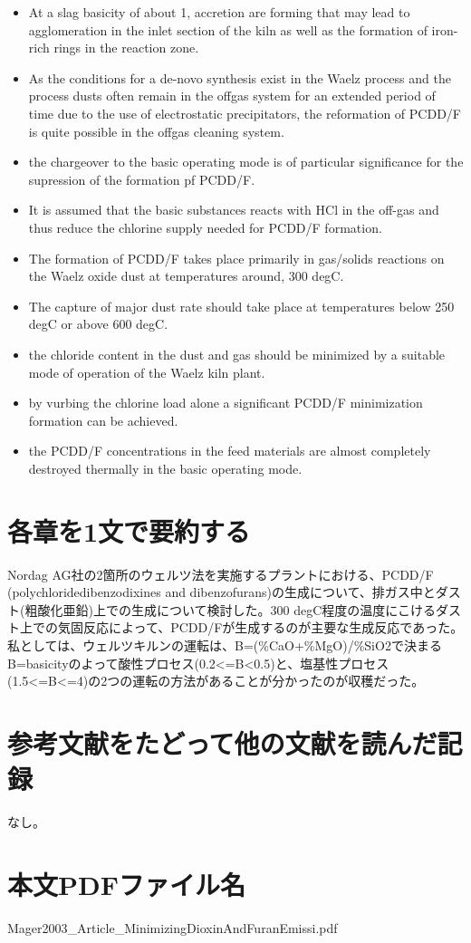 \documentclass[a4j]{jsarticle}
\begin{document}
\begin{itemize}
\item
At a slag basicity of about 1, accretion are forming that may lead to agglomeration in the inlet section of the kiln as well as the formation of iron-rich rings in the reaction zone.

\item
As the conditions for a de-novo synthesis exist in the Waelz process and the process dusts often remain in the offgas system for an extended period of time due to the use of electrostatic precipitators, the reformation of PCDD/F is quite possible in the offgas cleaning system.

\item
the chargeover to the basic operating mode is of particular significance for the supression of the formation pf PCDD/F.

\item
It is assumed that the basic substances reacts with HCl in the off-gas and thus reduce the chlorine supply needed for PCDD/F formation.

\item
The formation of PCDD/F takes place primarily in gas/solids reactions on the Waelz oxide dust at temperatures around, 300 degC.

\item
The capture of major dust rate should take place at temperatures below 250 degC or above 600 degC.

\item
the chloride content in the dust and gas should be minimized by a suitable mode of operation of the Waelz kiln plant.

\item
by vurbing the chlorine load alone a significant PCDD/F minimization formation can be achieved.

\item
the PCDD/F concentrations in the feed materials are almost completely destroyed thermally in the basic operating mode.

\end{itemize}


\section{各章を1文で要約する}
Nordag AG社の2箇所のウェルツ法を実施するプラントにおける、PCDD/F (polychloridedibenzodixines and dibenzofurans)の生成について、排ガス中とダスト(粗酸化亜鉛)上での生成について検討した。300 degC程度の温度にこけるダスト上での気固反応によって、PCDD/Fが生成するのが主要な生成反応であった。
私としては、ウェルツキルンの運転は、B=(\%CaO+\%MgO)/\%SiO2で決まるB=basicityのよって酸性プロセス(0.2<=B<0.5)と、塩基性プロセス(1.5<=B<=4)の2つの運転の方法があることが分かったのが収穫だった。

\section{参考文献をたどって他の文献を読んだ記録}
なし。

\section{本文PDFファイル名}
Mager2003\_Article\_MinimizingDioxinAndFuranEmissi.pdf


\end{document}
